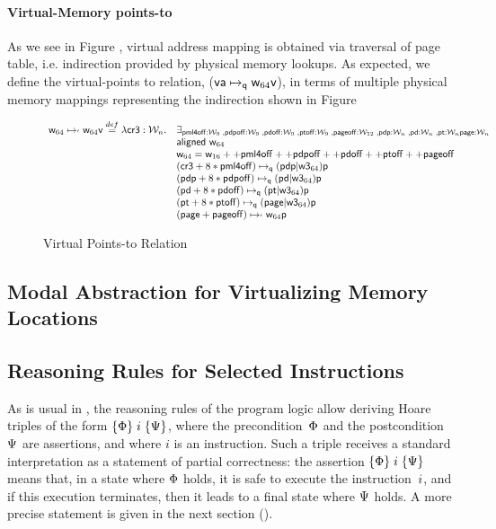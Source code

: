 \paragraph{Virtual-Memory points-to} As we see in Figure , virtual address mapping is obtained via traversal of page table, i.e. indirection provided by physical memory lookups. As expected, we define the virtual-points to relation, ($\mathsf{va}\mapsto_{\mathsf{q}}{\mathsf{w}_{64}}\mathsf{v}$), in terms of multiple physical memory mappings representing the indirection shown in Figure 
\begin{figure*}
\[
\begin{array}{cl}
  \mathsf{w}_{64}\mapsto_{'}\mathsf{w}_{64}\mathsf{v} \stackrel{def}{=} \lambda \mathsf{cr3}:\mathcal{W}_n.
  & \exists_{\mathsf{pml4off}:\mathcal{W}_{9} \;, \mathsf{pdpoff}:\mathcal{W}_{9} \;, \mathsf{pdoff}:\mathcal{W}_{9} \;, \mathsf{ptoff}:\mathcal{W}_{9} \;, \mathsf{pageoff}:\mathcal{W}_{12} \;, \mathsf{pdp}:\mathcal{W}_n \;, \mathsf{pd}:\mathcal{W}_n \;, \mathsf{pt}:\mathcal{W}_n \mathsf{page}:\mathcal{W}_n}\\
  & \textsf{aligned } \mathsf{w}_{64} \\
  & \mathsf{w}_{64} = \mathsf{w}_{16} ++ \mathsf{pml4off} ++ \mathsf{pdpoff} ++ \mathsf{pdoff} ++ \mathsf{ptoff} ++ \mathsf{pageoff} \\
  &  (\mathsf{cr3}+8*\mathsf{pml4off})\mapsto_{\mathsf{q}}{(\mathsf{pdp} | \mathsf{w3}_{64})}\mathsf{p} \\
  &  (\mathsf{pdp}+8*\mathsf{pdpoff})\mapsto_{\mathsf{q}}{(\mathsf{pd} | \mathsf{w3}_{64})}\mathsf{p} \\
  & (\mathsf{pd}+8*\mathsf{pdoff})\mapsto_{\mathsf{q}}{(\mathsf{pt} | \mathsf{w3}_{64})}\mathsf{p} \\
  & (\mathsf{pt}+8*\mathsf{ptoff})\mapsto_{\mathsf{q}}{(\mathsf{page} | \mathsf{w3}_{64})}\mathsf{p} \\
  & (\mathsf{page}+\mathsf{pageoff})\mapsto_{'}\mathsf{w}_{64}\mathsf{p} \\

\end{array}
\]
\caption{Virtual Points-to Relation}
  \label{fig:virtualpointsto}
\end{figure*}

\subsection{Modal Abstraction for Virtualizing Memory Locations}
\label{sec:modallocationvirtualization}


\subsection{Reasoning Rules for Selected Instructions}
\label{sec:reasoning}

As is usual in \SL, the reasoning rules of the program logic allow deriving
Hoare triples of the form $\{\Phi\}\;i\;\{\Psi\}$, where the
precondition~$\Phi$ and the postcondition~$\Psi$ are assertions,
and where $i$ is an instruction.
Such a triple receives a standard interpretation as a statement of partial
correctness: the assertion $\{\Phi\}\;i\;\{\Psi\}$ means that, in a state
where $\Phi$ holds, it is safe to execute the instruction~$i$, and if
this execution terminates, then it leads to a final state where $\Psi$ holds.
A more precise statement is given in the next section ().

